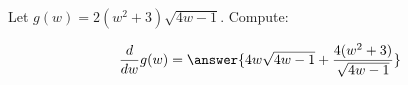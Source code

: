 \documentclass{ximera}
\author{Bobby Ramsey}
\begin{document}
\begin{exercise}
	Let $g(w) = 2(w^2+3)\sqrt{4w-1}$. 
	Compute:

	\[ \dd{w}g(w) =\answer{ 4w\sqrt{4w-1} + \frac{4(w^2+3)}{\sqrt{4w-1}}  } \]

\end{exercise}
\end{document}
